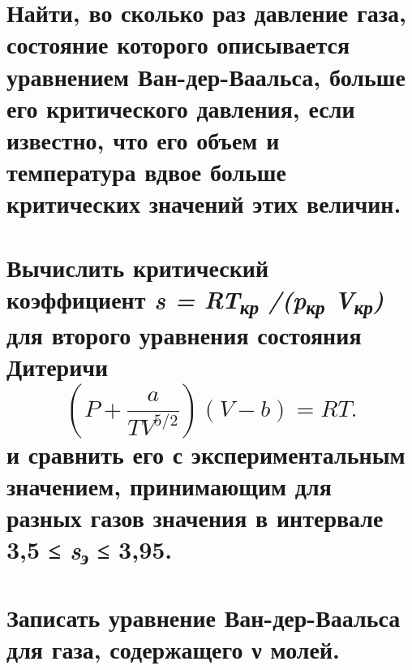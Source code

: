 \section{Найти, во сколько раз давление газа, состояние которого
описывается уравнением Ван-дер-Ваальса, больше его критического
давления, если известно, что его объем и температура вдвое больше
критических значений этих величин. }

\section{Вычислить критический коэффициент \emph{s =
RT\textsubscript{кр} /(p\textsubscript{кр} V\textsubscript{кр})} для
второго уравнения состояния Дитеричи
\begin{equation}
  \left (P + \frac{a}{TV^{5/2}} \right )(V-b) = RT.
\end{equation}
и сравнить его с экспериментальным значением, принимающим для
разных газов значения в интервале 3,5 ≤ \emph{s\textsubscript{э}} ≤
3,95.}

\section{Записать уравнение Ван-дер-Ваальса для газа, содержащего ν
молей.}
